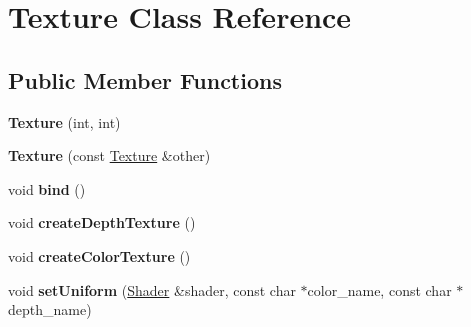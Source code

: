\hypertarget{classTexture}{\section{Texture Class Reference}
\label{classTexture}
}
\subsection*{Public Member Functions}
\begin{DoxyCompactItemize}
\item 
\hypertarget{classTexture_a7e7bdd0d2a5800093b14839128641fa5}{{\bfseries Texture} (int, int)}\label{classTexture_a7e7bdd0d2a5800093b14839128641fa5}

\item 
\hypertarget{classTexture_aea6e2585385d350d16497e27da372f3a}{{\bfseries Texture} (const \hyperlink{classTexture}{Texture} \&other)}\label{classTexture_aea6e2585385d350d16497e27da372f3a}

\item 
\hypertarget{classTexture_a3840dc7429982ffaddeafc8d62345b5d}{void {\bfseries bind} ()}\label{classTexture_a3840dc7429982ffaddeafc8d62345b5d}

\item 
\hypertarget{classTexture_a0f59025f128ec6b5a72029afe052662d}{void {\bfseries create\-Depth\-Texture} ()}\label{classTexture_a0f59025f128ec6b5a72029afe052662d}

\item 
\hypertarget{classTexture_a1512ff4f50d36c37df8be0630773bb93}{void {\bfseries create\-Color\-Texture} ()}\label{classTexture_a1512ff4f50d36c37df8be0630773bb93}

\item 
\hypertarget{classTexture_afb297b0d7987bab27a1580a3ed64ddd1}{void {\bfseries set\-Uniform} (\hyperlink{classShader}{Shader} \&shader, const char $\ast$color\-\_\-name, const char $\ast$depth\-\_\-name)}\label{classTexture_afb297b0d7987bab27a1580a3ed64ddd1}

\end{DoxyCompactItemize}
